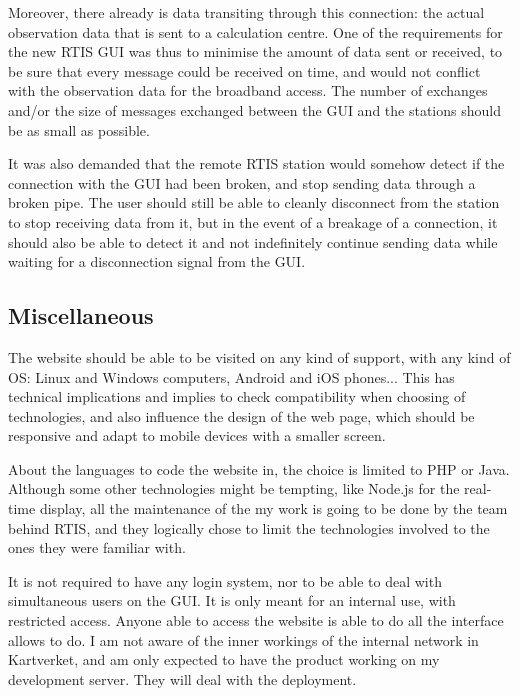 \documentclass{themeensg}
\begin{document}
Moreover, there already is data transiting through this connection: the actual observation data that is sent to a calculation centre. One of the requirements for the new RTIS GUI was thus to minimise the amount of data sent or received, to be sure that every message could be received on time, and would not conflict with the observation data for the broadband access. The number of exchanges and/or the size of messages exchanged between the GUI and the stations should be as small as possible.

It was also demanded that the remote RTIS station would somehow detect if the connection with the GUI had been broken, and stop sending data through a broken pipe. The user should still be able to cleanly disconnect from the station to stop receiving data from it, but in the event of a breakage of a connection, it should also be able to detect it and not indefinitely continue sending data while waiting for a disconnection signal from the GUI.

\subsection{Miscellaneous}
The website should be able to be visited on any kind of support, with any kind of OS: Linux and Windows computers, Android and iOS phones... This has technical implications and implies to check compatibility when choosing of technologies, and also influence the design of the web page, which should be responsive and adapt to mobile devices with a smaller screen.

About the languages to code the website in, the choice is limited to PHP or Java. Although some other  technologies might be tempting, like Node.js for the real-time display, all the maintenance of the my work is going to be done by the team behind RTIS, and they logically chose to limit the technologies involved to the ones they were familiar with.

It is not required to have any login system, nor to be able to deal with simultaneous users on the GUI. It is only meant for an internal use, with restricted access. Anyone able to access the website is able to do all the interface allows to do. I am not aware of the inner workings of the internal network in Kartverket, and am only expected to have the product working on my development server. They will deal with the deployment.

\end{document}
